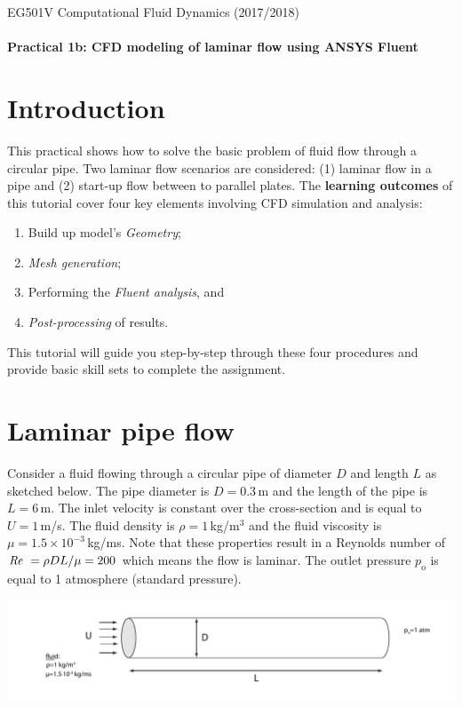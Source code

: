 \documentclass[11pt,a4paper,oneside,hidelinks]{scrartcl}
\newcommand\Rey{\mbox{\textit{Re}}\,\,}
\begin{document}
EG501V Computational Fluid Dynamics (2017/2018)
\\
\\
\textbf{Practical 1b: CFD modeling of laminar flow using ANSYS Fluent}

\section{Introduction}
This practical shows how to solve the basic problem of fluid flow through a circular pipe. Two laminar flow scenarios are considered: (1) laminar flow in a pipe and (2) start-up flow between to parallel plates. The {\bf learning outcomes} of this tutorial cover four key elements involving CFD simulation and  analysis:
\begin{enumerate}
  \item Build up model's \emph{Geometry};
  \item \emph{Mesh generation};
  \item Performing the \emph{Fluent analysis}, and
  \item \emph{Post-processing} of results.
\end{enumerate}
This tutorial will guide you step-by-step through these four procedures and provide basic skill sets to complete the assignment.

\section{Laminar pipe flow}
Consider a fluid flowing through a circular pipe of diameter $D$ and length $L$ as sketched below. The pipe diameter is $D=0.3$\,m and the length of the pipe is $L=6$\,m. The inlet velocity  is constant over the cross-section and is equal to $U=1$\,m/s. The  fluid density is $\rho=1$\,kg/m$^3$ and the fluid viscosity is $\mu=1.5\times10^{-3}$\,kg/ms. Note that these properties result in a Reynolds number of $\Rey=\rho DL/\mu=200$ which means the flow is laminar. The outlet pressure $p_\mathrm{o}$ is equal to 1 atmosphere (standard pressure).\\
\begin{center}
\includegraphics[width=\textwidth,clip]{pipe_sketch.pdf}
\end{center}
\end{document}
